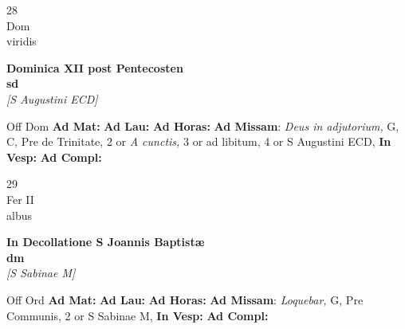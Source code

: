 \documentclass[10pt, openany]{book}
\begin{document}
        \begin{center}
            \begin{minipage}{3.5in}
                \vspace{2em}
                \begin{minipage}{0.5in}
                    {\Huge 28} \\
                    {\normalsize Dom} \\
                    {\normalsize viridis}
                \end{minipage}
                \begin{minipage}{3.0in}
                    \textbf{ \large Dominica XII post Pentecosten \\
                    \textnormal{\normalsize sd}} \\ \textit{[S Augustini ECD]} \\ 
                \end{minipage}
                \begin{justify}Off Dom
                    \textbf{Ad Mat: }
                    \textbf{Ad Lau: }
                    \textbf{Ad Horas: }\textbf{Ad Missam}: \textit{Deus in adjutorium,} G, C, Pre de Trinitate, 2 or \textit{A cunctis,} 3 or ad libitum, 4 or S Augustini ECD,  
                    \textbf{In Vesp: }
                    \textbf{Ad Compl: }
                \end{justify}
            \end{minipage}
        \end{center}
    
        \begin{center}
            \begin{minipage}{3.5in}
                \vspace{2em}
                \begin{minipage}{0.5in}
                    {\Huge 29} \\
                    {\normalsize Fer II} \\
                    {\normalsize albus}
                \end{minipage}
                \begin{minipage}{3.0in}
                    \textbf{ \large In Decollatione S Joannis Baptistæ \\
                    \textnormal{\normalsize dm}} \\ \textit{[S Sabinae M]} \\ 
                \end{minipage}
                \begin{justify}Off Ord
                    \textbf{Ad Mat: }
                    \textbf{Ad Lau: }
                    \textbf{Ad Horas: }\textbf{Ad Missam}: \textit{Loquebar,} G, Pre Communis, 2 or S Sabinae M,  
                    \textbf{In Vesp: }
                    \textbf{Ad Compl: }
                \end{justify}
            \end{minipage}
        \end{center}
    
\end{document}
